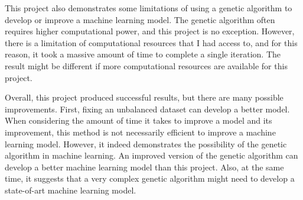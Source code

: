 \documentclass[11pt, natbib=false]{article}
\begin{document}
This project also demonstrates some limitations of using a genetic algorithm to develop or improve a machine learning model.
The genetic algorithm often requires higher computational power, and this project is no exception.
However, there is a limitation of computational resources that I had access to, and for this reason, it took a massive amount of time to complete a single iteration.
The result might be different if more computational resources are available for this project.

Overall, this project produced successful results, but there are many possible improvements.
First, fixing an unbalanced dataset can develop a better model.
When considering the amount of time it takes to improve a model and its improvement, this method is not necessarily efficient to improve a machine learning model.
However, it indeed demonstrates the possibility of the genetic algorithm in machine learning.
An improved version of the genetic algorithm can develop a better machine learning model than this project.
Also, at the same time, it suggests that a very complex genetic algorithm might need to develop a state-of-art machine learning model.



\newpage
\printbibliography
\newpage
\end{document}
